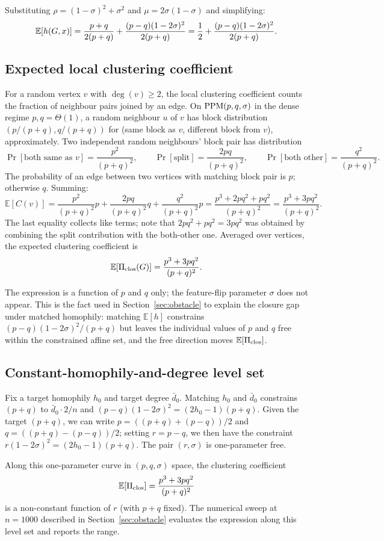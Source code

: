 Substituting $\rho = (1-\sigma)^2 + \sigma^2$ and $\mu = 2\sigma(1
- \sigma)$ and simplifying:
\[
\mathbb{E}[h(G, x)] = \frac{p + q}{2(p+q)} + \frac{(p - q)(1 -
2\sigma)^2}{2(p + q)} = \frac{1}{2} + \frac{(p - q)(1 - 2\sigma)^2}{2(p+q)}.
\]

\subsection*{Expected local clustering coefficient}

For a random vertex $v$ with $\deg(v) \ge 2$, the local clustering
coefficient counts the fraction of neighbour pairs joined by an edge.
On $\mathrm{PPM}(p, q, \sigma)$ in the dense regime $p, q = \Theta(1)$, a
random neighbour $u$ of $v$ has block distribution $(p / (p + q), q /
(p + q))$ for (same block as $v$, different block from $v$),
approximately. Two independent random neighbours' block pair has
distribution
\[
\Pr[\text{both same as } v] = \frac{p^2}{(p+q)^2},
\qquad
\Pr[\text{split}] = \frac{2 p q}{(p+q)^2},
\qquad
\Pr[\text{both other}] = \frac{q^2}{(p+q)^2}.
\]
The probability of an edge between two vertices with matching block
pair is $p$; otherwise $q$. Summing:
\[
\mathbb{E}[C(v)] = \frac{p^2}{(p+q)^2} p + \frac{2 p q}{(p+q)^2} q + \frac{q^2}{(p+q)^2} p = \frac{p^3 + 2 p q^2 + p q^2}{(p+q)^2} = \frac{p^3 + 3 p q^2}{(p+q)^2}.
\]
The last equality collects like terms; note that $2 p q^2 + p q^2 = 3
p q^2$ was obtained by combining the split contribution with the
both-other one. Averaged over vertices, the expected clustering
coefficient is
\[
\mathbb{E}[\Pi_{\mathrm{clos}}(G)] = \frac{p^3 + 3 p q^2}{(p + q)^2}.
\]

The expression is a function of $p$ and $q$ only; the feature-flip
parameter $\sigma$ does not appear. This is the fact used in
Section~\ref{sec:obstacle} to explain the closure gap under matched
homophily: matching $\mathbb{E}[h]$ constrains $(p - q)(1 - 2
\sigma)^2 / (p + q)$ but leaves the individual values of $p$ and $q$
free within the constrained affine set, and the free direction moves
$\mathbb{E}[\Pi_{\mathrm{clos}}]$.

\subsection*{Constant-homophily-and-degree level set}

Fix a target homophily $h_0$ and target degree $\bar d_0$. Matching
$h_0$ and $\bar d_0$ constrains $(p + q)$ to $\bar d_0 \cdot 2 / n$
and $(p - q)(1 - 2\sigma)^2 = (2 h_0 - 1)(p + q)$. Given the target
$(p + q)$, we can write $p = ((p+q) + (p-q))/2$ and $q = ((p+q) - (p-q))/2$;
setting $r = p - q$, we then have the constraint $r (1 - 2 \sigma)^2 =
(2 h_0 - 1)(p + q)$. The pair $(r, \sigma)$ is one-parameter free.

Along this one-parameter curve in $(p, q, \sigma)$ space, the
clustering coefficient
\[
\mathbb{E}[\Pi_{\mathrm{clos}}] = \frac{p^3 + 3 p q^2}{(p+q)^2}
\]
is a non-constant function of $r$ (with $p + q$ fixed). The numerical
sweep at $n = 1000$ described in Section~\ref{sec:obstacle} evaluates the
expression along this level set and reports the range.
